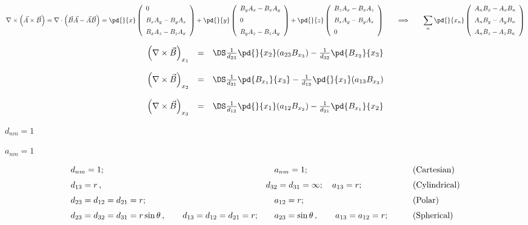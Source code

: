 \documentclass{article}
\begin{document}
\[      \nabla\times\left(\vec{A}\times\vec{B}\right) =
      \nabla\cdot \left(\vec{B}\vec{A} - \vec{A}\vec{B}\right) =
     \pd{}{x}\left(\begin{array}{l}
       0      \\ \noalign{\medskip}
       B_xA_y - B_yA_x \\ \noalign{\medskip}
       B_xA_z - B_zA_x
     \end{array}\right)
     +
     \pd{}{y}\left(\begin{array}{l}
       B_yA_x - B_xA_y \\ \noalign{\medskip}
       0               \\ \noalign{\medskip}
       B_yA_z - B_zA_y
     \end{array}\right)
     +
     \pd{}{z}\left(\begin{array}{l}
       B_zA_x - B_xA_z \\ \noalign{\medskip}
       B_zA_y - B_yA_z\\ \noalign{\medskip}
       0 
     \end{array}\right)
     \qquad\Longrightarrow\qquad
     \sum_n\pd{}{x_n}\left(\begin{array}{l}
       A_nB_x - A_xB_n\\ \noalign{\medskip}
       A_nB_y - A_yB_n\\ \noalign{\medskip}
       A_nB_z - A_zB_n
     \end{array}\right)
\]
\pagebreak

\[   \begin{array}{lcl}
    \left(\nabla\times\vec{B}\right)_{x_1} &=&  \DS
      \frac{1}{d_{23}}\pd{}{x_2}(a_{23}B_{x_3})
    - \frac{1}{d_{32}}\pd{B_{x_2}}{x_3}
 \\ \noalign{\bigskip}
    \left(\nabla\times\vec{B}\right)_{x_2} &=&  \DS
      \frac{1}{d_{31}}\pd{B_{x_1}}{x_3}
    - \frac{1}{d_{13}}\pd{}{x_1}(a_{13}B_{x_3})
 \\ \noalign{\bigskip}
    \left(\nabla\times\vec{B}\right)_{x_3} &=&  \DS
      \frac{1}{d_{12}}\pd{}{x_1}(a_{12}B_{x_2})
    - \frac{1}{d_{21}}\pd{B_{x_1}}{x_2}
   \end{array}
\]
\pagebreak

$d_{nm}=1$
\pagebreak

$a_{nm}=1$
\pagebreak

\[   \begin{array}{lll}
          d_{nm} = 1; & 
   \quad  a_{nm} = 1; & 
   \qquad ({\rm Cartesian})
   \\ \noalign{\medskip}
         d_{13} = r\,,\qquad & 
         d_{32} = d_{31} = \infty;  
   \quad a_{13} = r;  & 
   \qquad ({\rm Cylindrical})
   \\ \noalign{\medskip}
         d_{23} = d_{12} = d_{21} = r; & 
   \quad a_{12} = r;  & 
   \qquad ({\rm Polar})
   \\ \noalign{\medskip}
     d_{23} = d_{32} = d_{31} = r\sin\theta \,,\qquad
     d_{13} = d_{12} = d_{21} = r; &  
   \quad  a_{23} = \sin\theta\,,\qquad a_{13} = a_{12} = r; &
   \qquad ({\rm Spherical})
   \end{array}
\]
\pagebreak
\end{document}
